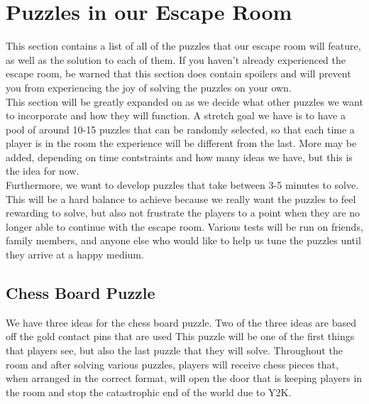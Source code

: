 \documentclass[conference]{IEEEtran}
\begin{document}
\section{Puzzles in our Escape Room}
This section contains a list of all of the puzzles that our escape room will feature, as well as
the solution to each of them. If you haven't already experienced the escape room, be warned that
this section does contain spoilers and will prevent you from experiencing the joy of solving the
puzzles on your own.
\\


\indent This section will be greatly expanded on as we decide what other puzzles we want to incorporate and how they will function.
A stretch goal we have is to have a pool of around 10-15 puzzles that can be randomly selected, so that each time a player is in the
room the experience will be different from the last. More may be added, depending on time contstraints and how many ideas we
have, but this is the idea for now.
\\
\indent Furthermore, we want to develop puzzles that take between 3-5 minutes to solve. This will be a hard balance
to achieve because we really want the puzzles to feel rewarding to solve, but also not frustrate the players
to a point when they are no longer able to continue with the escape room. Various tests will be run on friends, family members,
and anyone else who would like to help us tune the puzzles until they arrive at a happy medium.


\subsection{Chess Board Puzzle}
We have three ideas for the chess board puzzle. Two of the three ideas are based off the gold contact pins that are used
This puzzle will be one of the first things that players see, but also the last puzzle that they will solve.
Throughout the room and after solving various puzzles, players will receive chess pieces that, when
arranged in the correct format, will open the door that is keeping players in the room and stop the
catastrophic end of the world due to Y2K.
\end{document}
